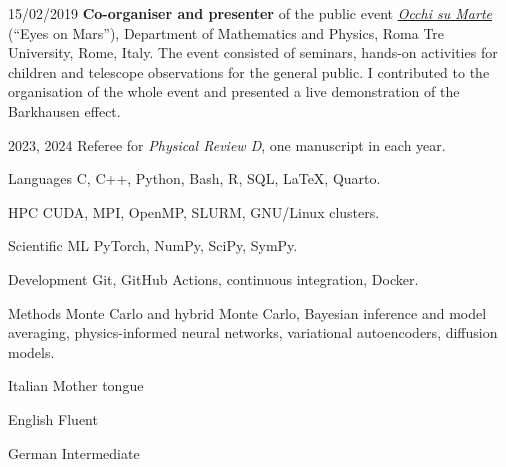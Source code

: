 
\begin{cvlist}
\item[15/02/2019] \textbf{Co-organiser and presenter} of the public event
\href{https://matematicafisica.uniroma3.it/terza-missione/iniziative-per-tutti/occhi-su-marte/}{\textit{Occhi su
Marte}} (``Eyes on Mars''), Department of Mathematics and Physics, Roma Tre University, Rome, Italy. The event
consisted of seminars, hands-on activities for children and telescope observations for the general public. I
contributed to the organisation of the whole event and presented a live demonstration of the Barkhausen effect.
\end{cvlist}


\begin{cvlist}
\item[2023, 2024] Referee for \textit{Physical Review D}, one manuscript in each year.
\end{cvlist}


\begin{cvlist}[2.6cm]
\item[Languages] C, C++, Python, Bash, R, SQL, \LaTeX{}, Quarto.
\item[HPC] CUDA, MPI, OpenMP, SLURM, GNU/Linux clusters.
\item[Scientific ML] PyTorch, NumPy, SciPy, SymPy.
\item[Development] Git, GitHub Actions, continuous integration, Docker.
\item[Methods] Monte Carlo and hybrid Monte Carlo, Bayesian inference and model averaging, physics-informed
neural networks, variational autoencoders, diffusion models.
\end{cvlist}


\begin{cvlist}[2.6cm]
\item[Italian] Mother tongue
\item[English] Fluent
\item[German] Intermediate
\end{cvlist}